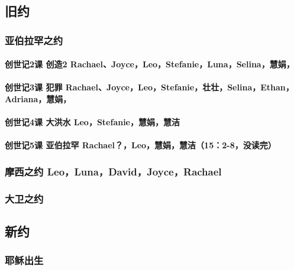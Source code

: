 \iffalse
\chapter{}

\section{旧约 }
\subsection{亚伯拉罕之约}
\subsubsection{创世记2课 创造2 Rachael、Joyce，Leo，Stefanie，Luna，Selina，慧娟，}
\subsubsection{创世记3课 犯罪 Rachael、Joyce，Leo，Stefanie，壮壮，Selina，Ethan，Adriana，慧娟，}
\subsubsection{创世记4课 大洪水 Leo，Stefanie，慧娟，慧洁}
\subsubsection{创世记5课 亚伯拉罕 Rachael？，Leo，慧娟，慧洁（15：2-8，没读完）}

\subsection{摩西之约 Leo，Luna，David，Joyce，Rachael}
\subsection{大卫之约 }

\section{新约}
\subsection{耶稣出生}
